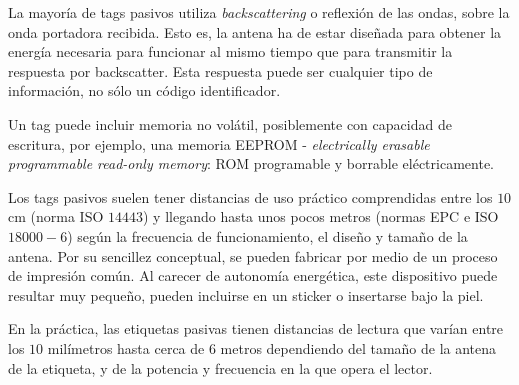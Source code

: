La mayoría de tags pasivos utiliza \emph{backscattering} o reflexión de las ondas, sobre la onda portadora recibida. Esto es, la antena ha de estar diseñada para obtener la energía necesaria para funcionar al mismo tiempo que para transmitir la respuesta por backscatter. Esta respuesta puede ser cualquier tipo de información, no sólo un código identificador.



Un tag puede incluir memoria no volátil, posiblemente con capacidad de escritura, por ejemplo, una memoria EEPROM - \emph{electrically erasable programmable read-only memory}: ROM programable y borrable eléctricamente. 

Los tags pasivos suelen tener distancias de uso práctico comprendidas entre los $10$cm (norma ISO $14443$) y llegando hasta unos pocos metros (normas EPC e ISO $18000-6$) según la frecuencia de funcionamiento, el diseño y tamaño de la antena. Por su sencillez conceptual, se pueden fabricar por medio de un proceso de impresión común. Al carecer de autonomía energética, este dispositivo puede resultar muy pequeño, pueden incluirse en un sticker o insertarse bajo la piel.


En la práctica, las etiquetas pasivas tienen distancias de lectura que varían entre los $10$ milímetros hasta cerca de $6$ metros dependiendo del tamaño de la antena de la etiqueta, y de la potencia y frecuencia en la que opera el lector.





